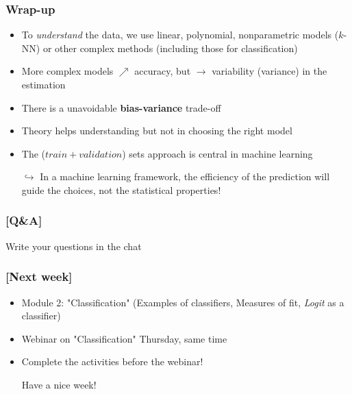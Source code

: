 \documentclass[xcolor=x11names,compress, aspectratio=169]{beamer}
\renewcommand{\(}{\begin{columns}}
\renewcommand{\)}{\end{columns}}
\newcommand{\<}[1]{\begin{column}{#1}}
\renewcommand{\>}{\end{column}}
\begin{document}
\begin{frame}
\frametitle{\textcolor{brique}{ Wrap-up }}
\pause
\begin{itemize}[<+->]
\item To \textit{understand }the data, we use linear, polynomial, nonparametric models ($k$-NN) or other complex methods (including those for classification)
\item More complex models $\nearrow$ accuracy, but $\rightarrow$ variability (variance) in the estimation
\item  There is a unavoidable  \textbf{bias-variance} trade-off
\item Theory helps understanding but not in choosing the right model
\item The ($train + validation$) sets approach is central in machine learning%
\item[$\hookrightarrow$] In a machine learning framework, the efficiency of the prediction will guide the choices, not the statistical properties! %
\end{itemize}
\end{frame}



\begin{frame} %
\frametitle{\textcolor{brique}{[Q\&A]}}
\begin{center}
\Large \textcolor{siap}{ Write your questions in the chat}
\end{center}

\end{frame}



\begin{frame} %
\frametitle{\textcolor{brique}{[Next week]}}
\pause
\begin{itemize}[<+->]
    \item Module 2: "Classification" (Examples of classifiers, Measures of fit, \emph{Logit} as a classifier)
    \item Webinar on "Classification" Thursday, same time
    \item Complete the activities before the webinar!
    \item[] \begin{center}
                \Large \textcolor{siap}{ Have a nice week!}
            \end{center}
\end{itemize}
\end{frame}
\end{document}
